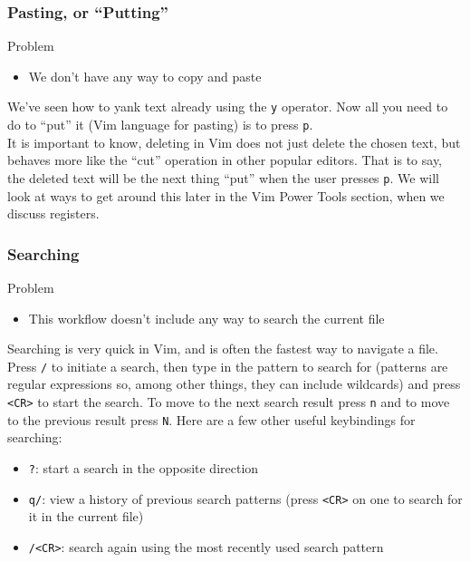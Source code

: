 \documentclass{beamer}
\begin{document}
\begin{frame}[fragile]
    \frametitle{Pasting, or \enquote{Putting}}
    \begin{block}{Problem}
	\begin{itemize}
	    \item We don't have any way to copy and paste
	\end{itemize}
    \end{block}
    We've seen how to yank text already using the \verb+y+ operator. Now all you need to do to \enquote{put} it (Vim language for pasting) is to press \verb+p+.\\
    \vspace{0.5cm}
    It is important to know, deleting in Vim does not just delete the chosen text, but behaves more like the \enquote{cut} operation in other popular editors. That is to say, the deleted text will be the next thing \enquote{put} when the user presses \verb+p+. We will look at ways to get around this later in the Vim Power Tools section, when we discuss registers.
\end{frame}

\begin{frame}[fragile]
    \frametitle{Searching}
    \begin{block}{Problem}
	\begin{itemize}
	    \item This workflow doesn't include any way to search the current file
	\end{itemize}
    \end{block}
    Searching is very quick in Vim, and is often the fastest way to navigate a file. Press \verb+/+ to initiate a search, then type in the pattern to search for (patterns are regular expressions so, among other things, they can include wildcards) and press \verb+<CR>+ to start the search. To move to the next search result press \verb+n+ and to move to the previous result press \verb+N+. Here are a few other useful keybindings for searching:
    \begin{itemize}
	\item \verb+?+: start a search in the opposite direction
	\item \verb+q/+: view a history of previous search patterns (press \verb+<CR>+ on one to search for it in the current file)
	\item \verb+/<CR>+: search again using the most recently used search pattern
    \end{itemize}
\end{frame}
\end{document}

